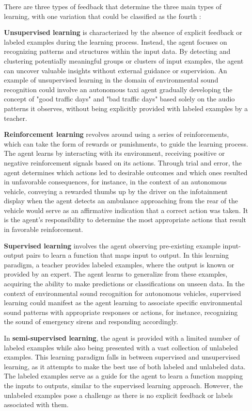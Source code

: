 There are three types of feedback that determine the three main types of learning, with one variation that could be classified as the fourth \cite{Russel2010}:

\textbf{Unsupervised learning} is characterized by the absence of explicit feedback or labeled examples during the learning process. Instead, the agent focuses on recognizing patterns and structures within the input data. By detecting and clustering potentially meaningful groups or clusters of input examples, the agent can uncover valuable insights without external guidance or supervision. An example of unsupervised learning in the domain of environmental sound recognition could involve an autonomous taxi agent gradually developing the concept of "good traffic days" and "bad traffic days" based solely on the audio patterns it observes, without being explicitly provided with labeled examples by a teacher.

\textbf{Reinforcement learning} revolves around using a series of reinforcements, which can take the form of rewards or punishments, to guide the learning process. The agent learns by interacting with its environment, receiving positive or negative reinforcement signals based on its actions. Through trial and error, the agent determines which actions led to desirable outcomes and which ones resulted in unfavorable consequences, for instance, in the context of an autonomous vehicle, conveying a rewarded thumbs up by the driver on the infotainment display when the agent detects an ambulance approaching from the rear of the vehicle would serve as an affirmative indication that a correct action was taken. It is the agent's responsibility to determine the most appropriate actions that result in favorable reinforcement.

\textbf{Supervised learning} involves the agent observing pre-existing example input-output pairs to learn a function that maps input to output. In this learning paradigm, a teacher provides labeled examples, where the output is known or provided by an expert. The agent learns to generalize from these examples, acquiring the ability to make predictions or classifications on unseen data. In the context of environmental sound recognition for autonomous vehicles, supervised learning could manifest as the agent learning to associate specific environmental sound patterns with appropriate responses or actions, for instance, recognizing the sound of emergency sirens and responding accordingly.

In \textbf{semi-supervised learning}, the agent is provided with a limited number of labeled examples while also being presented with a vast collection of unlabeled examples. This learning paradigm falls in between supervised and unsupervised learning, as it attempts to make the best use of both labeled and unlabeled data. The labeled examples serve as a guide for the agent to learn a function mapping the inputs to outputs, similar to the supervised learning approach. However, the unlabeled examples pose a challenge as there is no explicit feedback or labels associated with them.

